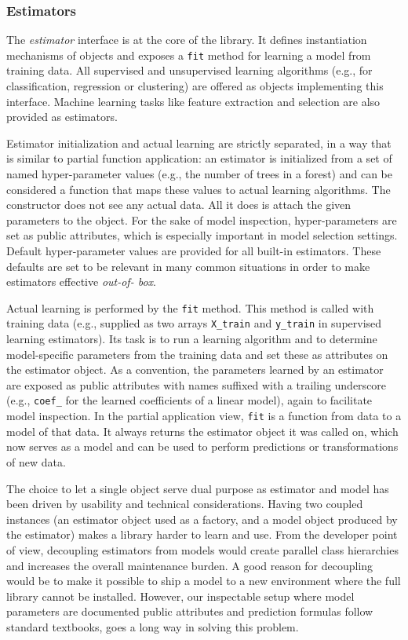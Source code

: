 \subsubsection{Estimators}

The \textit{estimator} interface is at the core of the library. It defines
instantiation mechanisms of objects and exposes a \texttt{fit} method for
learning a model from training data.  All supervised and unsupervised learning
algorithms (e.g., for classification, regression or clustering) are offered as
objects implementing this interface. Machine learning tasks like feature
extraction and selection are also provided as estimators.

Estimator initialization and actual learning are strictly separated, in a way
that is similar to partial function application: an estimator is initialized
from a set of named hyper-parameter values (e.g., the number of trees in a
forest) and can be considered a function that maps these values to actual
learning algorithms. The constructor does not see any actual data. All it does
is attach the given parameters to the object. For the sake of model inspection,
hyper-parameters are set as public attributes, which is especially important in
model selection settings. Default hyper-parameter values are provided for all
built-in estimators. These defaults are set to be relevant in many common
situations in order to make estimators effective \textit{out-of- box}.

Actual learning is performed by the \texttt{fit} method. This method is called
with training data (e.g., supplied as two arrays \texttt{X\_train} and
\texttt{y\_train} in supervised learning estimators). Its task is to run a
learning algorithm and to determine model-specific parameters from the training
data and set these as attributes on the estimator object. As a convention, the
parameters learned by an estimator are exposed as public attributes with names
suffixed with a trailing underscore (e.g., \texttt{coef\_} for the learned
coefficients of a linear model), again to facilitate model inspection. In the
partial application view, \texttt{fit} is a function from data to a model of
that data. It always returns the estimator object it was called on, which now
serves as a model and can be used to perform predictions or transformations of
new data.

The choice to let a single object serve dual purpose as estimator and model has
been driven by usability and technical considerations. Having two coupled
instances (an estimator object used as a factory, and a model object produced
by the estimator) makes a library harder to learn and use. From the developer
point of view, decoupling estimators from models would create parallel class
hierarchies and increases the overall maintenance burden. A good reason for
decoupling would be to make it possible to ship a model to a new environment
where the full library cannot be installed. However, our inspectable setup
where model parameters are documented public attributes and prediction formulas
follow standard textbooks, goes a long way in solving this problem.

